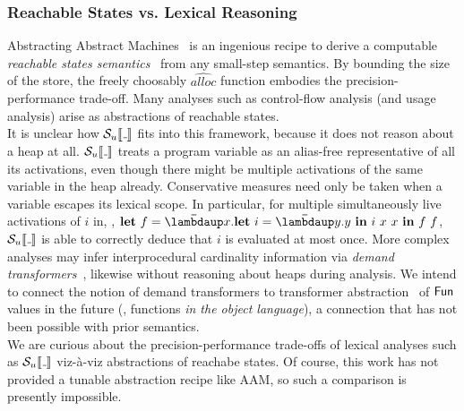 \subsubsection*{Reachable States vs. Lexical Reasoning}
Abstracting Abstract Machines~\citep{aam} is an ingenious recipe to derive
a computable \emph{reachable states semantics}~\citep{Cousot:21} from any
small-step semantics.
By bounding the size of the store, the freely choosably
$\widehat{\mathit{alloc}}$ function embodies the precision-performance trade-off.
Many analyses such as control-flow analysis (and usage analysis) arise as
abstractions of reachable states. \\
It is unclear how $\semusg{\wild}$ fits into this framework, because it does not
reason about a heap at all.
$\semusg{\wild}$ treats a program variable as an alias-free representative of
all its activations, even though there might be multiple activations of the same
variable in the heap already.
Conservative measures need only be taken when a variable escapes its lexical
scope.
In particular, for multiple simultaneously live activations of $i$ in, \eg,
  ${\Let{f}{\Lam{x}{\Let{i}{\Lam{y}{y}}{i~x~x}}}{f~f}}$,
$\semusg{\wild}$ is able to correctly deduce that $i$ is evaluated at most once.
More complex analyses may infer interprocedural cardinality information via
\emph{demand transformers}~\citep{cardinality-ext}, likewise without reasoning
about heaps during analysis.
We intend to connect the notion of demand transformers to transformer
abstraction~\citep{Cousot:21} of $\mathsf{Fun}$ values in the future (\ie, functions
\emph{in the object language}), a connection that has not been possible with
prior semantics. \\
We are curious about the precision-performance trade-offs of lexical analyses
such as $\semusg{\wild}$ viz-à-viz abstractions of reachabe states. Of course,
this work has not provided a tunable abstraction recipe like AAM, so such a
comparison is presently impossible.

